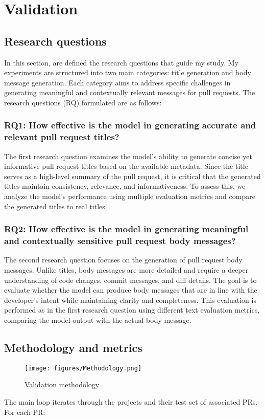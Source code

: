 \chapter{Validation}\label{chap:validation}
\section{Research questions}
In this section, are defined the research questions that guide my study. My experiments are structured into two main categories: title generation and body message generation. Each category aims to address specific challenges in generating meaningful and contextually relevant messages for pull requests. The research questions (RQ) formulated are as follows:

\subsection{RQ1: How effective is the model in generating accurate and relevant pull request titles?}
The first research question examines the model's ability to generate concise yet informative pull request titles based on the available metadata. Since the title serves as a high-level summary of the pull request, it is critical that the generated titles maintain consistency, relevance, and informativeness. To assess this, we analyze the model's performance using multiple evaluation metrics and compare the generated titles to real titles.

\subsection{RQ2: How effective is the model in generating meaningful and contextually sensitive pull request body messages?}
The second research question focuses on the generation of pull request body messages. Unlike titles, body messages are more detailed and require a deeper understanding of code changes, commit messages, and diff details. The goal is to evaluate whether the model can produce body messages that are in line with the developer's intent while maintaining clarity and completeness. This evaluation is performed as in the first research question using different text evaluation metrics, comparing the model output with the actual body message.
\section{Methodology and metrics}
\begin{figure}[H]
    \centering
    \texttt{[image: figures/Methodology.png]}
    \caption{Validation methodology}
\end{figure}
The main loop iterates through the projects and their test set of associated PRs. For each PR:

